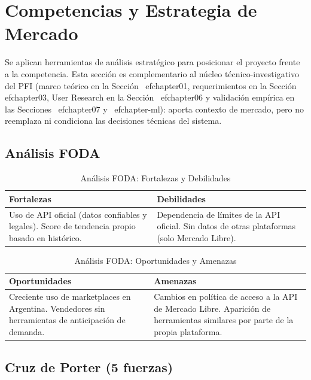 \chapter{Competencias y Estrategia de Mercado}\label{chapter05}

Se aplican herramientas de análisis estratégico para posicionar el proyecto frente a la competencia. Esta sección es complementario al núcleo técnico-investigativo del PFI (marco teórico en la Sección~
ef{chapter01}, requerimientos en la Sección~
ef{chapter03}, User Research en la Sección~
ef{chapter06} y validación empírica en las Secciones~
ef{chapter07} y~
ef{chapter-ml}): aporta contexto de mercado, pero no reemplaza ni condiciona las decisiones técnicas del sistema.

\section{Análisis FODA}

\begin{table}[ht]
	\centering
	\caption{Análisis FODA: Fortalezas y Debilidades}
	\label{tab:foda-fd}
	\begin{tabularx}{\textwidth}{@{}X X@{}}
		\toprule
		\textbf{Fortalezas} & \textbf{Debilidades} \\
		\midrule
		Uso de API oficial (datos confiables y legales). Score de tendencia propio basado en histórico. &
		Dependencia de límites de la API oficial. Sin datos de otras plataformas (solo Mercado Libre). \\
		\bottomrule
	\end{tabularx}
\end{table}

\begin{table}[ht]
	\centering
	\caption{Análisis FODA: Oportunidades y Amenazas}
	\label{tab:foda-oa}
	\begin{tabularx}{\textwidth}{@{}X X@{}}
		\toprule
		\textbf{Oportunidades} & \textbf{Amenazas} \\
		\midrule
		Creciente uso de marketplaces en Argentina. Vendedores sin herramientas de anticipación de demanda. &
		Cambios en política de acceso a la API de Mercado Libre. Aparición de herramientas similares por parte de la propia plataforma. \\
		\bottomrule
	\end{tabularx}
\end{table}

\section{Cruz de Porter (5 fuerzas)}

